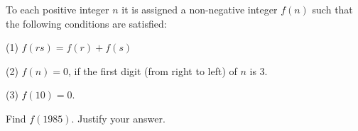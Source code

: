 To each positive integer $ n$ it is assigned a non-negative integer $f(n)$ such that the following conditions are satisfied:

(1) $ f(rs) = f(r)+f(s)$

(2) $ f(n) = 0$,  if the first digit (from right to left) of $ n$ is 3.

(3) $ f(10) = 0$.

Find $f(1985)$. Justify your answer.